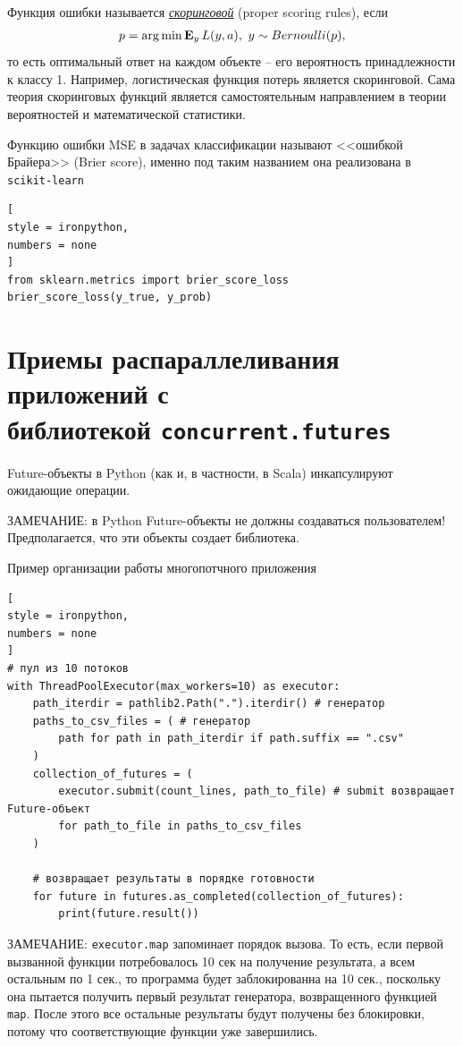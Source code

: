 \documentclass[%
	11pt,
	a4paper,
	utf8,
		]{article}
\begin{document}
Функция ошибки называется \href{https://dyakonov.org/2020/12/28/proper-scoring-rules/}{\emph{скоринговой}} (proper scoring rules), если
\begin{align*}
	p = \operatorname*{arg\,min} \mathbf{E}_y \,L(y, a), \ y \sim Bernoulli(p),
\end{align*}
то есть оптимальный ответ на каждом объекте -- его вероятность принадлежности к классу 1. Например, логистическая функция потерь является скоринговой. Сама теория скоринговых функций является самостоятельным направлением в теории вероятностей и математической статистики.

Функцию ошибки MSE в задачах классификации называют <<ошибкой Брайера>> (Brier score), именно под таким названием она реализована в \texttt{scikit-learn}
\begin{lstlisting}[
style = ironpython,
numbers = none	
]
from sklearn.metrics import brier_score_loss
brier_score_loss(y_true, y_prob)
\end{lstlisting}


\section{Приемы распараллеливания приложений с \\библиотекой \texttt{concurrent.futures}}

Future-объекты в Python (как и, в частности, в Scala) инкапсулируют ожидающие операции. 

ЗАМЕЧАНИЕ: в Python Future-объекты не должны создаваться пользователем! Предполагается, что эти объекты создает библиотека.

Пример организации работы многопотчного приложения
\begin{lstlisting}[
style = ironpython,
numbers = none	
]
# пул из 10 потоков
with ThreadPoolExecutor(max_workers=10) as executor:
    path_iterdir = pathlib2.Path(".").iterdir() # генератор
    paths_to_csv_files = ( # генератор
        path for path in path_iterdir if path.suffix == ".csv"
    )
    collection_of_futures = (
        executor.submit(count_lines, path_to_file) # submit возвращает Future-объект
        for path_to_file in paths_to_csv_files
    )
    
    # возвращает результаты в порядке готовности
    for future in futures.as_completed(collection_of_futures):
        print(future.result())
\end{lstlisting}

ЗАМЕЧАНИЕ: \texttt{executor.map} запоминает порядок вызова. То есть, если первой вызванной функции потребовалось 10 сек на получение результата, а всем остальным по 1 сек., то программа будет заблокированна на 10 сек., поскольку она пытается получить первый результат генератора, возвращенного функцией \texttt{map}. После этого все остальные результаты будут получены без блокировки, потому что соответствующие функции уже завершились.
\end{document}
